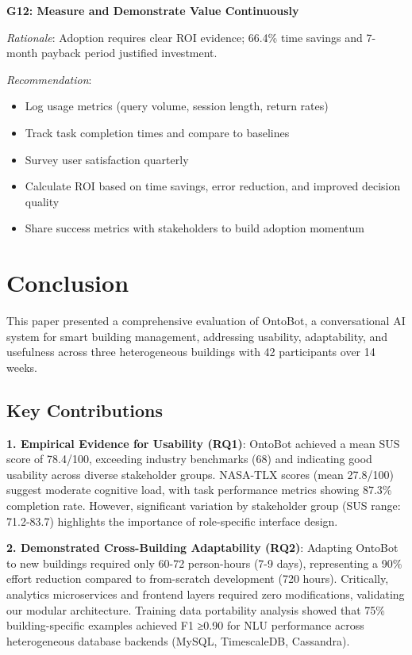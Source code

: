 \documentclass[acmlarge]{acmart}
\begin{document}
\textbf{G12: Measure and Demonstrate Value Continuously}

\textit{Rationale}: Adoption requires clear ROI evidence; 66.4\% time savings and 7-month payback period justified investment.

\textit{Recommendation}:
\begin{itemize}
    \item Log usage metrics (query volume, session length, return rates)
    \item Track task completion times and compare to baselines
    \item Survey user satisfaction quarterly
    \item Calculate ROI based on time savings, error reduction, and improved decision quality
    \item Share success metrics with stakeholders to build adoption momentum
\end{itemize}

\section{Conclusion}

This paper presented a comprehensive evaluation of OntoBot, a conversational AI system for smart building management, addressing usability, adaptability, and usefulness across three heterogeneous buildings with 42 participants over 14 weeks.

\subsection{Key Contributions}

\textbf{1. Empirical Evidence for Usability (RQ1)}: OntoBot achieved a mean SUS score of 78.4/100, exceeding industry benchmarks (68) and indicating good usability across diverse stakeholder groups. NASA-TLX scores (mean 27.8/100) suggest moderate cognitive load, with task performance metrics showing 87.3\% completion rate. However, significant variation by stakeholder group (SUS range: 71.2-83.7) highlights the importance of role-specific interface design.

\textbf{2. Demonstrated Cross-Building Adaptability (RQ2)}: Adapting OntoBot to new buildings required only 60-72 person-hours (7-9 days), representing a 90\% effort reduction compared to from-scratch development (720 hours). Critically, analytics microservices and frontend layers required zero modifications, validating our modular architecture. Training data portability analysis showed that 75\% building-specific examples achieved F1 ≥0.90 for NLU performance across heterogeneous database backends (MySQL, TimescaleDB, Cassandra).
\end{document}
